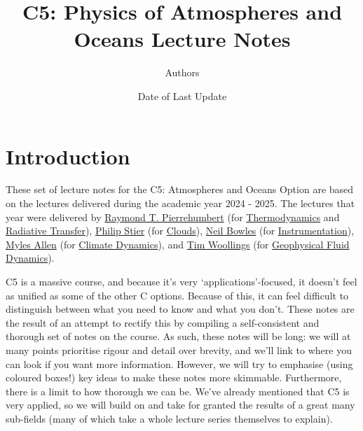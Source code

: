 \documentclass[a4paper,11pt]{report}
\title{C5: Physics of Atmospheres and Oceans Lecture Notes}
\author{Authors}
\date{Date of Last Update}
\begin{document}
\begin{titlingpage}
\maketitle
\end{titlingpage}

\tableofcontents

\newpage

\begin{sloppypar}

\section*{Introduction}

These set of lecture notes for the C5: Atmospheres and Oceans Option are based on the lectures delivered during the academic year 2024 - 2025. The lectures that year were delivered by 
\href{https://users.physics.ox.ac.uk/~pierrehumbert/}{Raymond T. Pierrehumbert} 
(for \hyperref[Thermodynamics]{Thermodynamics} and \hyperref[Radiative Transfer]{Radiative Transfer}), 
\href{https://www.physics.ox.ac.uk/our-people/stier}{Philip Stier} 
(for \hyperref[Clouds]{Clouds}), 
\href{https://www.physics.ox.ac.uk/our-people/bowles}{Neil Bowles} 
(for \hyperref[Instrumentation]{Instrumentation}), 
\href{https://www.physics.ox.ac.uk/our-people/allenm}{Myles Allen} 
(for \hyperlink{Climate Dynamics}{Climate Dynamics}), and \href{https://www.physics.ox.ac.uk/our-people/woollings}{Tim Woollings} 
(for \hyperref[Geophysical Fluid Dynamics]{Geophysical Fluid Dynamics}).

C5 is a massive course, and because it's very `applications'-focused, it doesn't feel as unified as some of the other C options. Because of this, it can feel difficult to distinguish between what you need to know and what you don't. These notes are the result of an attempt to rectify this by compiling a self-consistent and thorough set of notes on the course. As such, these notes will be long: we will at many points prioritise rigour and detail over brevity, and we'll link to where you can look if you want more information. However, we will try to emphasise (using coloured boxes!) key ideas to make these notes more skimmable. Furthermore, there is a limit to how thorough we can be. We've already mentioned that C5 is very applied, so we will build on and take for granted the results of a great many sub-fields (many of which take a whole lecture series themselves to explain).


\end{sloppypar}
\end{document}
